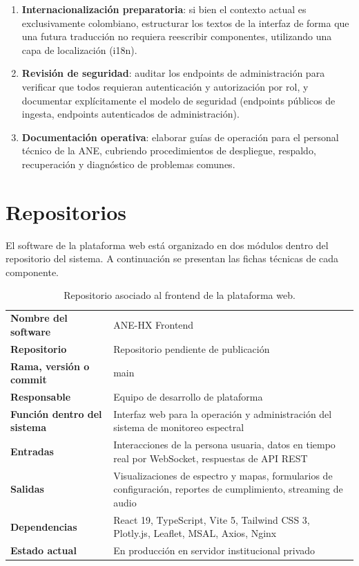 \begin{enumerate}
    \item \textbf{Internacionalización preparatoria}: si bien el contexto
    actual es exclusivamente colombiano, estructurar los textos de la interfaz
    de forma que una futura traducción no requiera reescribir componentes,
    utilizando una capa de localización (i18n).

    \item \textbf{Revisión de seguridad}: auditar los endpoints de
    administración para verificar que todos requieran autenticación y
    autorización por rol, y documentar explícitamente el modelo de seguridad
    (endpoints públicos de ingesta, endpoints autenticados de administración).

    \item \textbf{Documentación operativa}: elaborar guías de operación para
    el personal técnico de la ANE, cubriendo procedimientos de despliegue,
    respaldo, recuperación y diagnóstico de problemas comunes.
\end{enumerate}

\section{Repositorios}

El software de la plataforma web está organizado en dos módulos dentro del
repositorio del sistema. A continuación se presentan las fichas técnicas de
cada componente.

\begin{table}[H]
\centering
\caption{Repositorio asociado al frontend de la plataforma web.}
\label{tab:repo_frontend}
\begin{tabularx}{\textwidth}{>{\bfseries}l X}
\toprule
Nombre del software & ANE-HX Frontend \\
Repositorio & Repositorio pendiente de publicación \\
Rama, versión o commit & main \\
Responsable & Equipo de desarrollo de plataforma \\
Función dentro del sistema & Interfaz web para la operación y administración
del sistema de monitoreo espectral \\
Entradas & Interacciones de la persona usuaria, datos en tiempo real por
WebSocket, respuestas de API REST \\
Salidas & Visualizaciones de espectro y mapas, formularios de configuración,
reportes de cumplimiento, streaming de audio \\
Dependencias & React 19, TypeScript, Vite 5, Tailwind CSS 3, Plotly.js,
Leaflet, MSAL, Axios, Nginx \\
Estado actual & En producción en servidor institucional privado \\
\bottomrule
\end{tabularx}
\end{table}

